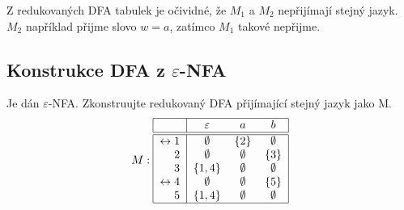 Z redukovaných DFA tabulek je očividné, že $M_1$ a $M_2$ nepřijímají stejný jazyk. $M_2$ například přijme slovo $w=a$,
zatímco $M_1$ takové nepřijme.

\subsection{Konstrukce DFA z \texorpdfstring{$\varepsilon$}{e}-NFA}
Je dán $\varepsilon$-NFA. Zkonstruujte redukovaný DFA přijímající stejný jazyk jako M.
\[
M:
\begin{tabular}{|r|c c c|}
    \hline
    & $\varepsilon$ & $a$ & $b$ \\ \hline \hline
    $\leftrightarrow 1$& $\emptyset$& $\bc{2}$   & $\emptyset$ \\
    $2$                & $\emptyset$& $\emptyset$& $\bc{3}$ \\
    $3$                & $\bc{1,4}$ & $\emptyset$& $\emptyset$ \\
    $\leftrightarrow 4$& $\emptyset$& $\emptyset$& $\bc{5}$ \\
    $5$                & $\bc{1,4}$ & $\emptyset$& $\emptyset$ \\
    \hline
\end{tabular}
\]

